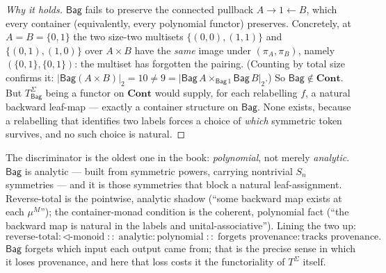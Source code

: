 \documentclass[11pt,a4paper]{book}
\newcommand{\Cont}{\mathbf{Cont}}
\theoremstyle{plain}
\theoremstyle{definition}
\theoremstyle{remark}
\begin{document}
\begin{proof}[Why it holds]
$\mathsf{Bag}$ fails to preserve the connected pullback $A\to 1\leftarrow B$, which every container
(equivalently, every polynomial functor) preserves. Concretely, at $A=B=\{0,1\}$ the two size-two
multisets $\{(0,0),(1,1)\}$ and $\{(0,1),(1,0)\}$ over $A\times B$ have the \emph{same} image under
$(\pi_{A},\pi_{B})$, namely $(\{0,1\},\{0,1\})$: the multiset has forgotten the pairing. (Counting by
total size confirms it: $\lvert\mathsf{Bag}(A\times B)\rvert_{2}=10\neq 9=\lvert\mathsf{Bag}\,A\times_{\mathsf{Bag}\,1}\mathsf{Bag}\,B\rvert_{2}$.)
So $\mathsf{Bag}\notin\Cont$. But $T^{\Sigma}_{\mathsf{Bag}}$ being a functor on $\Cont$ would supply,
for each relabelling $f$, a natural backward leaf-map --- exactly a container structure on
$\mathsf{Bag}$. None exists, because a relabelling that identifies two labels forces a
choice of \emph{which} symmetric token survives, and no such choice is natural.
\end{proof}

The discriminator is the oldest one in the book: \emph{polynomial}, not merely \emph{analytic}.
$\mathsf{Bag}$ is analytic --- built from symmetric powers, carrying nontrivial $S_{n}$ symmetries ---
and it is those symmetries that block a natural leaf-assignment. Reverse-total is the pointwise,
analytic shadow (``some backward map exists at each $\mu^{M}$''); the container-monad condition is the
coherent, polynomial fact (``the backward map is natural in the labels and unital-associative'').
Lining the two up:
\[
  \text{reverse-total} : \triangleleft\text{-monoid}
  \;::\;
  \text{analytic} : \text{polynomial}
  \;::\;
  \text{forgets provenance} : \text{tracks provenance}.
\]
$\mathsf{Bag}$ forgets which input each output came from; that is the precise sense in which it loses
provenance, and here that loss costs it the functoriality of $T^{\Sigma}$ itself.
\end{document}
